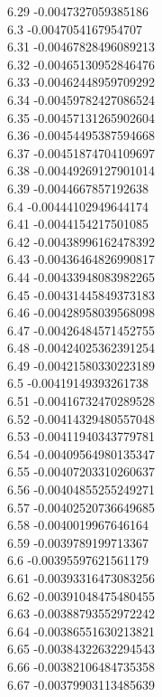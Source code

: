 {6.29	-0.0047327059385186\\
6.3	-0.0047054167954707\\
6.31	-0.00467828496089213\\
6.32	-0.00465130952846476\\
6.33	-0.00462448959709292\\
6.34	-0.00459782427086524\\
6.35	-0.00457131265902604\\
6.36	-0.00454495387594668\\
6.37	-0.00451874704109697\\
6.38	-0.00449269127901014\\
6.39	-0.0044667857192638\\
6.4	-0.00444102949644174\\
6.41	-0.0044154217501085\\
6.42	-0.00438996162478392\\
6.43	-0.00436464826990817\\
6.44	-0.00433948083982265\\
6.45	-0.00431445849373183\\
6.46	-0.00428958039568098\\
6.47	-0.00426484571452755\\
6.48	-0.00424025362391254\\
6.49	-0.00421580330223189\\
6.5	-0.00419149393261738\\
6.51	-0.00416732470289528\\
6.52	-0.00414329480557048\\
6.53	-0.00411940343779781\\
6.54	-0.00409564980135347\\
6.55	-0.00407203310260637\\
6.56	-0.00404855255249271\\
6.57	-0.00402520736649685\\
6.58	-0.0040019967646164\\
6.59	-0.0039789199713367\\
6.6	-0.00395597621561179\\
6.61	-0.00393316473083256\\
6.62	-0.00391048475480455\\
6.63	-0.00388793552972242\\
6.64	-0.00386551630213821\\
6.65	-0.00384322632294543\\
6.66	-0.00382106484735358\\
6.67	-0.00379903113485639\\
}
